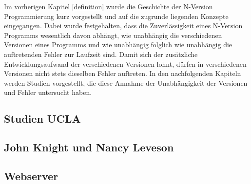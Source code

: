 %
Im vorherigen Kapitel \ref{definition} wurde die Geschichte der N-Version Programmierung kurz vorgestellt und auf die zugrunde liegenden Konzepte eingegangen.
Dabei wurde festgehalten, dass die Zuverlässigkeit eines N-Version Programms wesentlich davon abhängt, wie unabhängig die verschiedenen Versionen eines Programms und wie unabhängig folglich wie unabhängig die auftretenden Fehler zur Laufzeit sind. Damit sich der zusätzliche Entwicklungsaufwand der verschiedenen Versionen lohnt, dürfen in verschiedenen Versionen nicht stets dieselben Fehler auftreten.
In den nachfolgenden Kapiteln werden Studien vorgestellt, die diese Annahme der Unabhängigkeit der Versionen und Fehler untersucht haben.
%
\subsection{Studien UCLA}\label{uclastudies}

\subsection{John Knight und Nancy Leveson}\label{matrixexperiement}



\subsection{Webserver}\label{webserver}